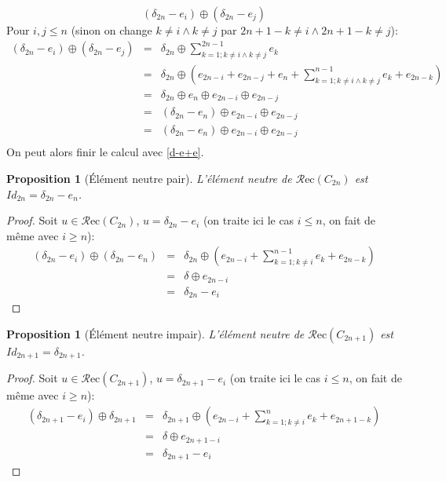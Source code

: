 \documentclass{report}
\newtheorem{property}[theorem]{Proposition}
\newcommand{\recu}[1]{\ensuremath{\mathcal{R}\text{ec}(#1)}}
\newcommand{\plus}{\ensuremath{\oplus}}
\begin{document}
$$(\delta_{2n} - e_i) \plus{} (\delta_{2n} - e_j)$$
Pour $i, j \leq n$ (sinon on change $k \not=i \land k \not=j$ par $2n+1-k \not=i \land 2n+1-k \not=j$):
\begin{eqnarray}
(\delta_{2n} - e_i) \plus{} (\delta_{2n} - e_j) 
&=& \delta_{2n} \plus{} \sum_{k=1; k \not=i \land k \not=j}^{2n-1} e_k\\
&=& \delta_{2n} \plus{} (e_{2n-i} + e_{2n-j} + e_n + \sum_{k=1; k \not=i \land k \not=j}^{n - 1} e_k + e_{2n - k})\\
&=& \delta_{2n} \plus{} e_n \plus{} e_{2n-i} \plus{} e_{2n-j}\\
&=& (\delta_{2n} - e_n) \plus{} e_{2n-i} \plus{} e_{2n-j}\\
&=& (\delta_{2n} - e_n) \plus{} e_{2n-i} \plus{} e_{2n-j}\\
\end{eqnarray}
On peut alors finir le calcul avec \ref{d-e+e}.



\begin{property}[Élément neutre pair]
L'élément neutre de \recu{C_{2n}} est $Id_{2n} = \delta_{2n} - e_n$.
\end{property}
\begin{proof}
Soit $u\in \recu{C_{2n}}$, $u = \delta_{2n} - e_i$ (on traite ici le cas $i \leq n$, on fait de même avec $i \geq n$):
\begin{eqnarray}
(\delta_{2n} - e_i) \plus{} (\delta_{2n} - e_n)
&=& \delta_{2n} \plus{} (e_{2n-i} + \sum_{k=1; k \not= i}^{n-1} e_k + e_{2n-k}) \\
&=& \delta \plus e_{2n-i} \\
&=& \delta_{2n} - e_i
\end{eqnarray}
\end{proof}

\begin{property}[Élément neutre impair]
L'élément neutre de \recu{C_{2n+1}} est $Id_{2n+1} = \delta_{2n+1}$.
\end{property}
\begin{proof}
Soit $u\in \recu{C_{2n+1}}$, $u = \delta_{2n+1} - e_i$ (on traite ici le cas $i \leq n$, on fait de même avec $i \geq n$):
\begin{eqnarray}
(\delta_{2n+1} - e_i) \plus{} \delta_{2n+1}
&=& \delta_{2n+1} \plus{} (e_{2n-i} + \sum_{k=1; k \not= i}^{n} e_k + e_{2n+1-k}) \\
&=& \delta \plus e_{2n+1-i} \\
&=& \delta_{2n+1} - e_i
\end{eqnarray}\end{proof}
\end{document}
